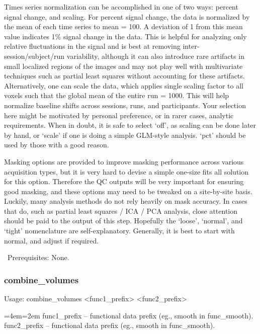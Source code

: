 \documentclass[final,titlepage,letterpaper,oneside,12pt]{article}
\renewcommand{\texttt}[2][BrickRed]{\textcolor{#1}{\ttfamily #2}}%
\newenvironment{blockquote}{%
  \par%
  \medskip
  \leftskip=4em\rightskip=2em%
  \noindent\ignorespaces}{%
  \par\medskip}
\begin{document}
Times series normalization can be accomplished in one of two ways: percent signal change, and scaling. For percent signal change, the data is normalized by the mean of each time series to mean = 100. A deviation of 1 from this mean value indicates 1\% signal change in the data. This is helpful for analyzing only relative fluctuations in the signal and is best at removing inter-session/subject/run variability, although it can also introduce rare artifacts in small localized regions of the images and may not play well with multivariate techniques such as partial least squares without accounting for these artifacts. Alternatively, one can scale the data, which applies single scaling factor to all voxels such that the global mean of the entire run = 1000. This will help normalize baseline shifts across sessions, runs, and participants. Your selection here might be motivated by personal preference, or in rarer cases, analytic requirements. When in doubt, it is safe to select `off', as scaling can be done later by hand, or `scale' if one is doing a simple GLM-style analysis. `pct' should be used by those with a good reason.

Masking options are provided to improve masking performance across various acquisition types, but it is very hard to devise a simple one-size fits all solution for this option. Therefore the QC outputs will be very important for ensuring good masking, and these options may need to be tweaked on a site-by-site basis. Luckily, many analysis methods do not rely heavily on mask accuracy. In cases that do, such as partial least squares / ICA / PCA analysis, close attention should be paid to the output of this step. Hopefully the `loose', `normal', and `tight' nomenclature are self-explanatory. Generally, it is best to start with normal, and adjust if required.

\
Prerequisites: None.

\subsubsection{combine\_volumes}
Usage: \texttt{combine\_volumes <func1\_prefix> <func2\_prefix>}

\begin{blockquote}
func1\_prefix -- functional data prefix (eg., smooth in func\_smooth).
func2\_prefix -- functional data prefix (eg., smooth in func\_smooth).
\end{blockquote}
\end{document}
